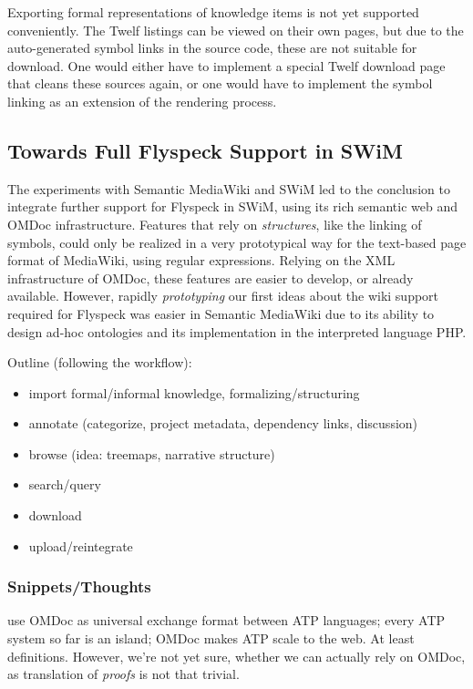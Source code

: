 \documentclass{llncs}
\begin{document}
Exporting formal representations of knowledge items is not yet supported conveniently.
The Twelf listings can be viewed on their own pages, but due to the auto-generated symbol
links in the source code, these are not suitable for download.  One would either have to
implement a special Twelf download page that cleans these sources again, or one would have
to implement the symbol linking as an extension of the rendering process.

\subsection{Towards Full Flyspeck Support in SWiM}
\label{sec:flyspeck-swim}

The experiments with Semantic MediaWiki and SWiM led to the conclusion to integrate
further support for Flyspeck in SWiM, using its rich semantic web and OMDoc
infrastructure.  Features that rely on \emph{structures}, like the linking of symbols,
could only be realized in a very prototypical way for the text-based page format of
MediaWiki, using regular expressions.  Relying on the XML infrastructure of OMDoc, these
features are easier to develop, or already available.  However, rapidly \emph{prototyping}
our first ideas about the wiki support required for Flyspeck was easier in Semantic
MediaWiki due to its ability to design ad-hoc ontologies and its implementation in the
interpreted language PHP.

Outline (following the workflow):
\begin{itemize}
\item import formal/informal knowledge, formalizing/structuring
\item annotate (categorize, project metadata, dependency links, discussion)
\item browse (idea: treemaps, narrative structure)
\item search/query
\item download
\item upload/reintegrate
\end{itemize}

\subsubsection{Snippets/Thoughts}

use OMDoc as universal exchange format between ATP languages; every ATP system so far is
an island; OMDoc makes ATP scale to the web.  At least definitions.  However, we're not
yet sure, whether we can actually rely on OMDoc, as translation
of \emph{proofs} is not that trivial.
\end{document}
